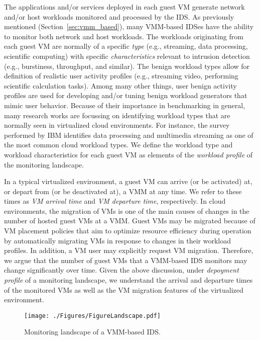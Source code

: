 The applications and/or services deployed in each guest VM generate network and/or host workloads monitored and processed by the IDS. As previously mentioned (Section~\ref{sec:vmm_based}), many VMM-based IDSes have the ability to monitor both network and host workloads. The workloads originating from each guest VM are normally of a specific \emph{type} (e.g., streaming, data processing, scientific computing) with specific \emph{characteristics} relevant to intrusion detection (e.g., burstiness, throughput, and similar). The benign workload types allow for definition of realistic user activity profiles (e.g., streaming video, performing scientific calculation tasks). Among many other things, user benign activity profiles are used for developing and/or tuning benign workload generators that mimic user behavior. Because of their importance in benchmarking in general, many research works are focussing on identifying workload types that are normally seen in virtualized cloud environments. For instance, the survey performed by IBM \cite{ibm:dispelling} identifies data processing and multimedia streaming as one of the most common cloud workload types. We define the workload type and workload characteristics for each guest VM as elements of the \emph{workload profile} of the monitoring landscape. 

In a typical virtualized environment, a guest VM can arrive (or be activated) at, or depart from (or be deactivated at), a VMM at any time. We refer to these times as \emph{VM arrival time} and \emph{VM departure time}, respectively. In cloud environments, the migration of VMs is one of the main causes of changes in the number of hosted guest VMs at a VMM. Guest VMs may be migrated because of VM placement policies that aim to optimize resource efficiency during operation by automatically migrating VMs in response to changes in their workload profiles. In addition, a VM user may explicitly request VM migration. Therefore, we argue that the number of guest VMs that a VMM-based IDS monitors may change significantly over time. Given the above discussion, under \emph{depoyment profile} of a monitoring landscape, we understand the arrival and departure times of the monitored VMs as well as the VM migration features of the virtualized environment. 

\begin{figure*}[!th]
\centering
\texttt{[image: ./Figures/FigureLandscape.pdf]}
\caption{Monitoring landscape of a VMM-based IDS.}
\label{fig:monitoring_landscape}
\end{figure*}

